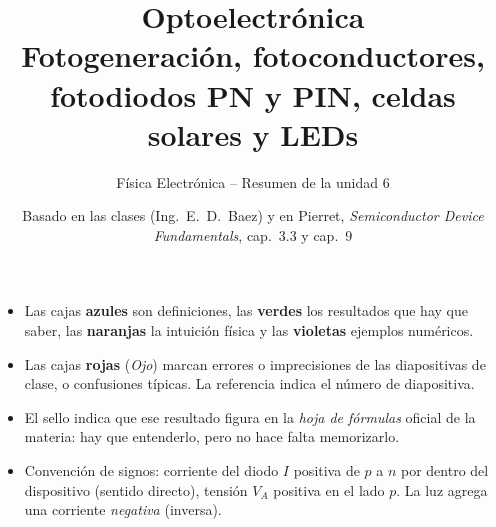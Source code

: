 \documentclass[11pt,a4paper]{article}
\title{\color{azul}\textbf{Optoelectrónica}\\[0.3em]
  \large Fotogeneración, fotoconductores, fotodiodos PN y PIN, celdas solares y LEDs}
\author{Física Electrónica -- Resumen de la unidad 6}
\date{Basado en las clases (Ing.~E.~D.~Baez) y en Pierret, \emph{Semiconductor Device Fundamentals}, cap.~3.3 y cap.~9}
\begin{document}
\maketitle
\thispagestyle{empty}

\begin{tcolorbox}[base,colback=white,colframe=gris,title={Cómo leer este apunte}]
\small
\begin{itemize}
  \item Las cajas \textcolor{azul}{\textbf{azules}} son definiciones, las \textcolor{verde}{\textbf{verdes}} los resultados
  que hay que saber, las \textcolor{naranja}{\textbf{naranjas}} la intuición física y las \textcolor{violeta}{\textbf{violetas}} ejemplos numéricos.
  \item Las cajas \textcolor{rojo}{\textbf{rojas}} (\emph{Ojo}) marcan errores o imprecisiones de las diapositivas de clase,
  o confusiones típicas. La referencia  indica el número de diapositiva.
  \item El sello \enhojatexto{} indica que ese resultado figura en la \emph{hoja de fórmulas}
  oficial de la materia: hay que entenderlo, pero no hace falta memorizarlo.
  \item Convención de signos: corriente del diodo $I$ positiva de $p$ a $n$ por dentro del dispositivo
  (sentido directo), tensión $V_A$ positiva en el lado $p$. La luz agrega una corriente \emph{negativa} (inversa).
\end{itemize}
\end{tcolorbox}

\tableofcontents
\newpage









\end{document}
